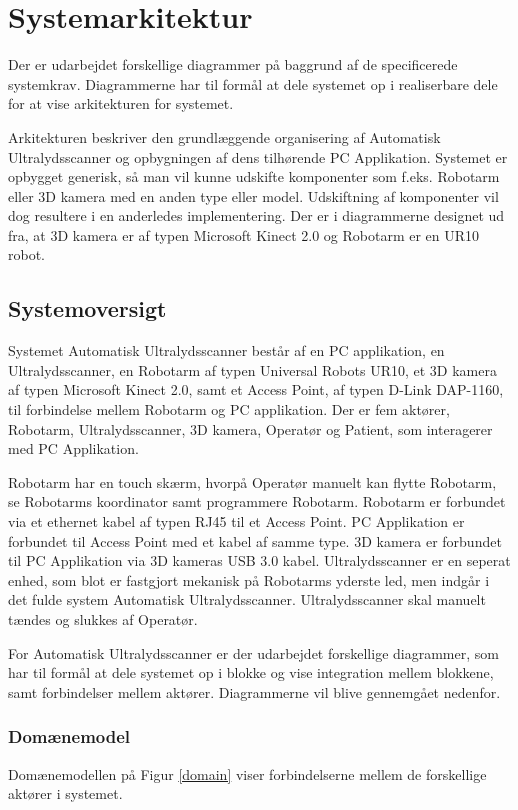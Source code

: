 \chapter{Systemarkitektur}\label{Systemarkitektur}
Der er udarbejdet forskellige diagrammer på baggrund af de specificerede systemkrav.  Diagrammerne har til formål at dele systemet op i realiserbare dele for at vise arkitekturen for systemet. 

Arkitekturen beskriver den grundlæggende organisering af Automatisk Ultralydsscanner og opbygningen af dens tilhørende PC Applikation. Systemet er opbygget generisk, så man vil kunne udskifte komponenter som f.eks. Robotarm eller 3D kamera med en anden type eller model. Udskiftning af komponenter vil dog resultere i en anderledes implementering. Der er i diagrammerne designet ud fra, at 3D kamera er af typen Microsoft Kinect 2.0 og Robotarm er en UR10 robot. 

\section{Systemoversigt}
Systemet Automatisk Ultralydsscanner består af en PC applikation, en Ultralydsscanner, en Robotarm af typen Universal Robots UR10, et 3D kamera af typen Microsoft Kinect 2.0, samt et Access Point, af typen D-Link DAP-1160, til forbindelse mellem Robotarm og PC applikation. Der er fem aktører, Robotarm, Ultralydsscanner, 3D kamera, Operatør og Patient, som interagerer med PC Applikation.

Robotarm har en touch skærm, hvorpå Operatør manuelt kan flytte Robotarm, se Robotarms koordinator samt programmere Robotarm. Robotarm er forbundet via et ethernet kabel af typen RJ45 til et Access Point. PC Applikation er forbundet til Access Point med et kabel af samme type. 3D kamera er forbundet til PC Applikation via 3D kameras USB 3.0 kabel. Ultralydsscanner er en seperat enhed, som blot er fastgjort mekanisk på Robotarms yderste led, men indgår i det fulde system Automatisk Ultralydsscanner. Ultralydsscanner skal manuelt tændes og slukkes af Operatør.

For Automatisk Ultralydsscanner er der udarbejdet forskellige diagrammer, som har til formål at dele systemet op i blokke og vise integration mellem blokkene, samt forbindelser mellem aktører. Diagrammerne vil blive gennemgået nedenfor. 
\newpage

\subsection{Domænemodel}
Domænemodellen på Figur \ref{domain} viser forbindelserne mellem de forskellige aktører i systemet. 

